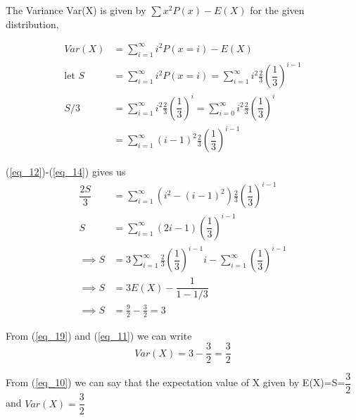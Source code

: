 The Variance Var(X) is given by $\sum x^2 P(x) - E(X)$ for the given distribution,

\begin{align}
Var(X) & =\sum_{i=1}^{\infty} i^2P(x=i) - E(X)\label{eq_11}\\
\text{let } S & = \sum_{i=1}^{\infty} i^2P(x=i)=\sum_{i=1}^{\infty} i^2 \frac{2}{3}\left(\dfrac{1}{3}\right)^{i-1} \label{eq_12}\\
S/3&= \sum_{i=1}^{\infty} i^2 \frac{2}{3}\left(\dfrac{1}{3}\right)^{i}=\sum_{i=0}^{\infty} i^2 \frac{2}{3}\left(\dfrac{1}{3}\right)^{i}\\
& = \sum_{i=1}^{\infty} (i-1)^2 \frac{2}{3}\left(\dfrac{1}{3}\right)^{i-1}\label{eq_14}
\end{align}

(\ref{eq_12})-(\ref{eq_14}) gives us
\begin{align}
\dfrac{2S}{3} & = \sum_{i=1}^{\infty} (i^2-(i-1)^2) \frac{2}{3}\left(\dfrac{1}{3}\right)^{i-1}\\
S &= \sum_{i=1}^{\infty} (2i-1)\left(\dfrac{1}{3}\right)^{i-1} \\
\implies S&= 3 \sum_{i=1}^{\infty} \frac{2}{3}\left(\dfrac{1}{3}\right)^{i-1}i-\sum_{i=1}^{\infty} \left(\dfrac{1}{3}\right)^{i-1} \\
\implies S&= 3E(X)-\dfrac{1}{1-1/3}\\
\implies S& = \frac{9}{2}-\frac{3}{2}=3 \label{eq_19}
\end{align}

From (\ref{eq_19}) and (\ref{eq_11}) we can write 
$$Var(X)=3-\frac{3}{2}=\frac{3}{2}$$

From (\ref{eq_10}) we can say that the expectation value of X given by E(X)=S=$\dfrac{3}{2}$		
and $Var(X)=\dfrac{3}{2}$  
